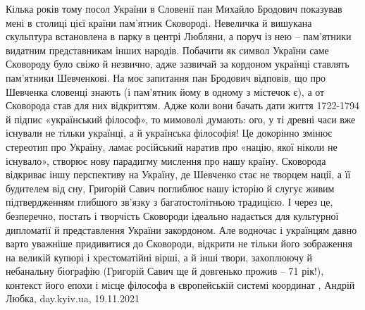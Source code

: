  
 
 
 
 

Кілька років тому посол України в Словенії пан Михайло Бродович показував мені
в столиці цієї країни пам’ятник Сковороді. Невеличка й вишукана скульптура
встановлена в парку в центрі Любляни, а поруч із нею – пам’ятники видатним
представникам інших народів. Побачити як символ України саме Сковороду було
свіжо й незвично, адже зазвичай за кордоном українці ставлять пам’ятники
Шевченкові.  На моє запитання пан Бродович відповів, що про Шевченка словенці
знають (і пам’ятник йому в одному з містечок є), а от Сковорода став для них
відкриттям.  Адже коли вони бачать дати життя 1722-1794 й підпис «український
філософ», то мимоволі думають: ого, у ті древні часи вже існували не тільки
українці, а й українська філософія! Це докорінно змінює стереотип про Україну,
ламає російський наратив про «націю, якої ніколи не існувало», створює нову
парадигму мислення про нашу країну. Сковорода відкриває іншу перспективу на
Україну, де Шевченко стає не творцем нації, а її будителем від сну, Григорій
Савич поглиблює нашу історію й слугує живим підтвердженням глибшого зв’язку з
багатостолітньою традицією.  І через це, безперечно, постать і творчість
Сковороди ідеально надається для культурної дипломатії й представлення України
закордоном. Але водночас і українцям давно варто уважніше придивитися до
Сковороди, відкрити не тільки його зображення на великій купюрі і хрестоматійні
вірші, а й інші твори, захоплюючу й небанальну біографію (Григорій Савич ще й
довгенько прожив – 71 рік!), контекст його епохи і місце філософа в
європейській системі координат
, 
Андрій Любка, day.kyiv.ua, 19.11.2021
